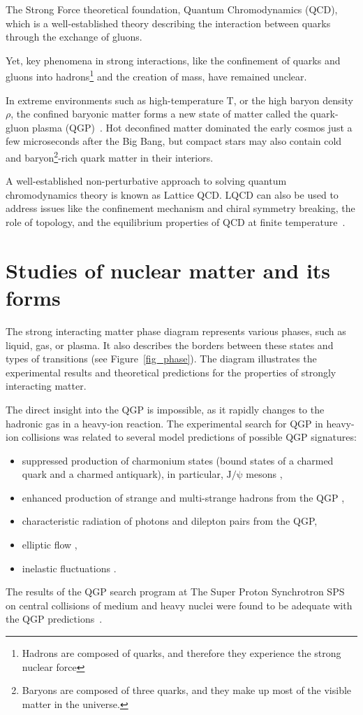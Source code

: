 \newpage

The Strong Force theoretical foundation, Quantum Chromodynamics (QCD), which is a well-established theory describing the interaction between quarks through the exchange of gluons. 

Yet, key phenomena in strong interactions, like the confinement of quarks and gluons into hadrons\footnote{Hadrons are composed of quarks, and therefore they experience the strong nuclear force} and the creation of mass, have remained unclear.

In extreme environments such as high-temperature T, or the high baryon density $\rho$, the confined baryonic matter forms a new state of matter called the quark-gluon plasma (\gls{QGP})~\cite{phase_diagram}. Hot deconfined matter dominated the early cosmos just a few microseconds after the Big Bang, but compact stars may also contain cold and baryon\footnote{Baryons are composed of three quarks, and they make up most of the visible matter in the universe.}-rich quark matter in their interiors.

A well-established non-perturbative approach to solving quantum chromodynamics theory is known as Lattice \gls{QCD}. LQCD can also be used to address issues like the confinement mechanism and chiral symmetry breaking, the role of topology, and the equilibrium properties of \gls{QCD} at finite temperature~\cite{lattice_qcd}. 

\section{Studies of nuclear matter and its forms}
 The strong interacting matter phase diagram represents various phases, such as liquid, gas, or plasma. It also describes the borders between these states and types of transitions (see Figure~\ref{fig_phase}). The diagram illustrates the experimental results and theoretical predictions for the properties of strongly interacting matter.

The direct insight into the \gls{QGP} is impossible, as it rapidly changes to the hadronic gas in a heavy-ion reaction. The experimental search for \gls{QGP} in heavy-ion collisions was related to several model predictions of possible \gls{QGP} signatures: 
\begin{itemize}
    \item suppressed production of charmonium states (bound states of a charmed quark and a charmed antiquark), in particular, $\mathrm{J/\psi}$ mesons \cite{MATSUI1986416},
    \item enhanced production of strange and multi-strange hadrons from the \gls{QGP} \cite{strageness},
    \item characteristic radiation of photons and dilepton pairs from the \gls{QGP},
    \item elliptic flow \cite{Stefaniak:2022dxo},
    \item inelastic fluctuations \cite{Stefaniak:2022dxo}.
\end{itemize}
The results of the QGP search program at The Super Proton Synchrotron \gls{SPS} on central collisions of medium and heavy nuclei were found to be adequate with the QGP predictions~\cite{Rafelski_2015}.

